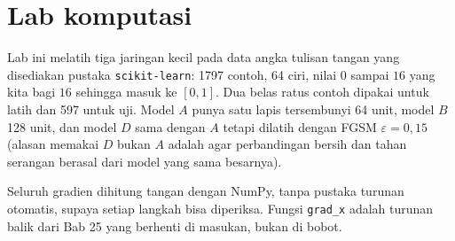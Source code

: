 \section{Lab komputasi}

Lab ini melatih tiga jaringan kecil pada data angka tulisan tangan yang disediakan
pustaka \texttt{scikit-learn}: 1797 contoh, 64 ciri, nilai $0$ sampai $16$ yang kita
bagi $16$ sehingga masuk ke $[0,1]$. Dua belas ratus contoh dipakai untuk latih dan
597 untuk uji. Model $A$ punya satu lapis tersembunyi 64 unit, model $B$ 128 unit,
dan model $D$ sama dengan $A$ tetapi dilatih dengan FGSM $\varepsilon=0{,}15$
(alasan memakai $D$ bukan $A$ adalah agar perbandingan bersih dan tahan serangan
berasal dari model yang sama besarnya).

Seluruh gradien dihitung tangan dengan NumPy, tanpa pustaka turunan otomatis, supaya
setiap langkah bisa diperiksa. Fungsi \texttt{grad\_x} adalah turunan balik dari Bab 25
yang berhenti di masukan, bukan di bobot.


